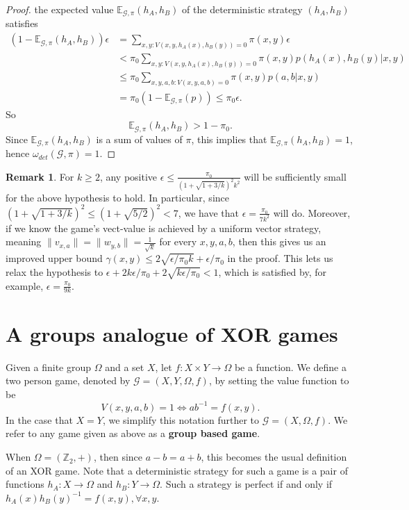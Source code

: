 \documentclass[11pt]{amsart}
\theoremstyle{definition}
\newtheorem{remark}[thm]{Remark}
\newcommand{\bb}[1]{\mathbb{#1}}
\newcommand{\cl}[1]{\mathcal{#1}}
\begin{document}
\begin{proof}
the expected value $\bb E_{\cl G,\pi}(h_A,h_B)$ of the deterministic strategy $(h_A,h_B)$ satisfies
\begin{align*}
  (1-\bb E_{\cl G,\pi}(h_A,h_B))\epsilon&=\sum_{x,y:V(x,y,h_A(x),h_B(y))=0}\pi(x,y)\epsilon
  \\&
  < \pi_0\sum_{x,y:V(x,y,h_A(x),h_B(y))=0}\pi(x,y) p(h_A(x),h_B(y)|x,y)
  \\&
  \leq \pi_0\sum_{x,y,a,b:V(x,y,a,b)=0}\pi(x,y) p(a,b|x,y)
  \\&=\pi_0(1-\bb E_{\cl G,\pi}(p))\leq\pi_0 \epsilon.
\end{align*}
So
\[ \bb E_{\cl G,\pi}(h_A,h_B)> 1-\pi_0.\]
Since $\bb E_{\cl G,\pi}(h_A,h_B)$ is a sum of values of $\pi$, this implies that $\bb E_{\cl G,\pi}(h_A,h_B)=1$, hence $\omega_{det}(\cl G,\pi)=1$.
\end{proof}
\begin{remark}\label{remark:constant}
  For $k\ge2$, any positive $\epsilon\le \frac{\pi_0}{(1+\sqrt{1+3/k})^2k^2}$ will be sufficiently small for the above hypothesis to hold. In particular, since $(1+\sqrt{1+3/k})^2\le (1+\sqrt{5/2})^2<7$, we have that $\epsilon=\frac{\pi_0}{7k^2}$ will do.
  Moreover, if we know the game's vect-value is achieved by a uniform vector strategy, meaning $\|v_{x,a}\|=\|w_{y,b}\|=\tfrac1{\sqrt k}$ for every $x,y,a,b$, then this gives us an improved upper bound $\gamma(x,y)\le 2\sqrt{\epsilon/\pi_0k}+\epsilon/\pi_0$ in the proof. This lets us relax the hypothesis to $\epsilon+ 2k\epsilon/\pi_0+2\sqrt{k\epsilon/\pi_0}<1$, which is satisfied by, for example, $\epsilon=\frac{\pi_0}{9k}$.
\end{remark}

\section{A groups analogue of XOR games}
 Given a finite group $\Omega$ and a set $X$, let $f:X \times Y \to \Omega$ be a function.
 We define a two person game, denoted by $\cl G= (X, Y, \Omega, f)$, by setting the value function to be
 \[ V(x,y,a,b) =1 \iff a b^{-1} = f(x,y).\] In the case that $X=Y$, we simplify this notation further to $\cl G= (X, \Omega, f)$.
 We refer to any game given as above as a {\bf group based game}.

 When $\Omega = (\bb Z_2, +)$, then since $a-b=a+b$, this becomes the usual definition of an XOR game.
 Note that a deterministic strategy for such a game is a pair of functions $h_A: X \to \Omega$ and $h_B:Y \to \Omega$. Such a strategy is perfect if and only if $h_A(x) h_B(y)^{-1} = f(x,y), \forall x,y$.
\end{document}
